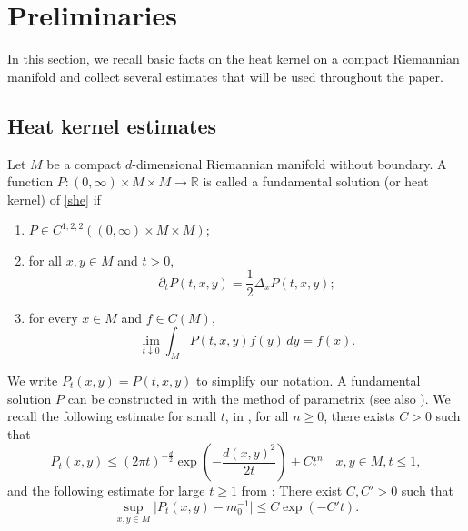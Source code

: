 \documentclass[12pt]{amsart}
\numberwithin{equation}{section}
\newcommand{\R}{\mathbb{R}}
\newcommand{\1}{\mathbf{1}}
\begin{document}
\section{Preliminaries}
\label{estimates} 
In this section, we recall basic facts on the heat kernel on a compact Riemannian manifold and collect several estimates that will be used throughout the paper.

\subsection{Heat kernel estimates}
Let $M$ be a compact $d$-dimensional Riemannian manifold without boundary. A function $P:(0,\infty)\times M \times M\to\R$ is called a fundamental solution (or heat kernel) of \eqref{she} if \begin{enumerate}
    \item $P\in C^{1,2,2}\left((0,\infty)\times M\times M\right)$;
    \item for all $x,y\in M$ and $t>0$,
    \[
        \partial_t P(t,x,y) = \frac{1}{2}\Delta_x P(t,x,y);
    \]
    \item for every $x\in M$ and $f\in C(M)$,
    \[
        \lim_{t\downarrow 0}\int_M P(t,x,y)f(y)\,dy = f(x).
    \]
\end{enumerate}
We write $P_t(x,y)=P(t,x,y)$ to simplify our notation. A fundamental solution $P$ can be constructed in \cite{Minakshisundaram:1953xh} with the method of parametrix (see also \cite{minakshisundaram1949some}). We recall the following estimate for small $t$, in \cite{Minakshisundaram:1953xh}, for all $n\geq0$, there exists $C>0$ such that
\begin{equation}
\label{heatkernelbound1}
    P_t(x,y)\leq (2\pi t)^{-\frac{d}{2}}\exp\left(-\frac{d(x,y)^2}{2t}\right)+Ct^n\quad x,y\in M,t\leq 1,
\end{equation}
and the following estimate for large $t\geq 1$ from \cite{baxter1976energy}: There exist $C,C'>0$ such that
\begin{equation}
    \label{heatkernelbound2}
    \sup_{x,y\in M}\vert P_t(x,y)-m_0^{-1}\vert\leq C\exp(-C't).
\end{equation}
\end{document}
